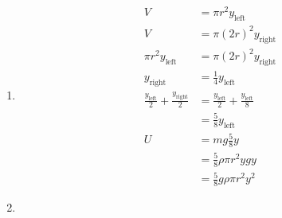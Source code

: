 \documentclass{article}
\begin{document}
\subsection{}

\begin{enumerate}
  \item

        \begin{align*}
          V                                                  & = \pi r^2 y_\text{left}                             \\
          V                                                  & = \pi (2 r)^2 y_\text{right}                        \\
          \pi r^2 y_\text{left}                              & = \pi (2 r)^2 y_\text{right}                        \\
          y_\text{right}                                     & = \frac{1}{4} y_\text{left}                         \\
          \frac{y_\text{left}}{2} + \frac{y_\text{right}}{2} & = \frac{y_\text{left}}{2} + \frac{y_\text{left}}{8} \\
                                                             & = \frac{5}{8} y_\text{left}                         \\
          U                                                  & = m g \frac{5}{8} y                                 \\
                                                             & = \frac{5}{8} \rho \pi r^2 y g y                    \\
                                                             & = \frac{5}{8} g \rho \pi r^2 y^2
        \end{align*}

  \item


\end{enumerate}
\end{document}
